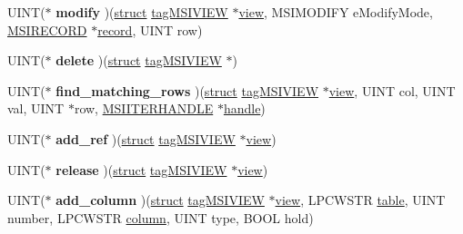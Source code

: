 \begin{DoxyCompactItemize}
U\+I\+NT($\ast$ {\bfseries modify} )(\hyperlink{interfacestruct}{struct} \hyperlink{structtag_m_s_i_v_i_e_w}{tag\+M\+S\+I\+V\+I\+EW} $\ast$\hyperlink{structview}{view}, M\+S\+I\+M\+O\+D\+I\+FY e\+Modify\+Mode, \hyperlink{structtag_m_s_i_r_e_c_o_r_d}{M\+S\+I\+R\+E\+C\+O\+RD} $\ast$\hyperlink{structrecord}{record}, U\+I\+NT row)
\item 
\mbox{\label{structtag_m_s_i_v_i_e_w_o_p_s_aee7c15dc555ff13b8d01adf828046333}} 
U\+I\+NT($\ast$ {\bfseries delete} )(\hyperlink{interfacestruct}{struct} \hyperlink{structtag_m_s_i_v_i_e_w}{tag\+M\+S\+I\+V\+I\+EW} $\ast$)
\item 
\mbox{\label{structtag_m_s_i_v_i_e_w_o_p_s_ae5e8550ff8e33e6dfbb4e5b2047c8ce4}} 
U\+I\+NT($\ast$ {\bfseries find\+\_\+matching\+\_\+rows} )(\hyperlink{interfacestruct}{struct} \hyperlink{structtag_m_s_i_v_i_e_w}{tag\+M\+S\+I\+V\+I\+EW} $\ast$\hyperlink{structview}{view}, U\+I\+NT col, U\+I\+NT val, U\+I\+NT $\ast$row, \hyperlink{structtag_m_s_i_c_o_l_u_m_n_h_a_s_h_e_n_t_r_y}{M\+S\+I\+I\+T\+E\+R\+H\+A\+N\+D\+LE} $\ast$\hyperlink{structhandle}{handle})
\item 
\mbox{\label{structtag_m_s_i_v_i_e_w_o_p_s_ab18e0e999cc32b0845284b59b5629a25}} 
U\+I\+NT($\ast$ {\bfseries add\+\_\+ref} )(\hyperlink{interfacestruct}{struct} \hyperlink{structtag_m_s_i_v_i_e_w}{tag\+M\+S\+I\+V\+I\+EW} $\ast$\hyperlink{structview}{view})
\item 
\mbox{\label{structtag_m_s_i_v_i_e_w_o_p_s_ab6dfb8e8101b2793093bcc05e214c03d}} 
U\+I\+NT($\ast$ {\bfseries release} )(\hyperlink{interfacestruct}{struct} \hyperlink{structtag_m_s_i_v_i_e_w}{tag\+M\+S\+I\+V\+I\+EW} $\ast$\hyperlink{structview}{view})
\item 
\mbox{\label{structtag_m_s_i_v_i_e_w_o_p_s_a9bfbfdc10ac440f7651dae753d7ad1ab}} 
U\+I\+NT($\ast$ {\bfseries add\+\_\+column} )(\hyperlink{interfacestruct}{struct} \hyperlink{structtag_m_s_i_v_i_e_w}{tag\+M\+S\+I\+V\+I\+EW} $\ast$\hyperlink{structview}{view}, L\+P\+C\+W\+S\+TR \hyperlink{structtable}{table}, U\+I\+NT number, L\+P\+C\+W\+S\+TR \hyperlink{structcolumn}{column}, U\+I\+NT type, B\+O\+OL hold)
\item 
\mbox{\label{structtag_m_s_i_v_i_e_w_o_p_s_a19845ff5e4adf58cc366b00be6be015f}} 

\end{DoxyCompactItemize}
